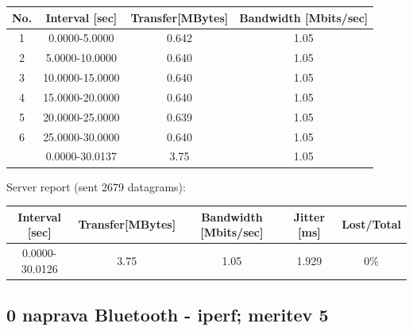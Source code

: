 \documentclass[11pt,a4paper,slovene]{article}
\begin{document}
\begin{table}[H]
	\begin{adjustwidth}{-3cm}{-3cm}
	\centering
		\begin{tabular}{c|c|c|c}
		\hline
		\textbf{No.} & \textbf{Interval [sec]} & \textbf{Transfer[MBytes]} & \textbf{Bandwidth [Mbits/sec]}\\
     		\hline
     		1 & 0.0000-5.0000 & 0.642 & 1.05\\
  		2 & 5.0000-10.0000 & 0.640 & 1.05\\
  		3 & 10.0000-15.0000 & 0.640 & 1.05\\
  		4 & 15.0000-20.0000 & 0.640 & 1.05\\
  		5 & 20.0000-25.0000 & 0.639 & 1.05\\
  		6 & 25.0000-30.0000 & 0.640 & 1.05\\
  		\hline
  		& 0.0000-30.0137 & 3.75 & 1.05\\
  		\hline
    		\end{tabular}
    	\end{adjustwidth}
\end{table}

Server report (sent 2679 datagrams):\\

\begin{table}[H]
	\begin{adjustwidth}{-3cm}{-3cm}
	\centering
		\begin{tabular}{c|c|c|c|c}
		\hline
		\textbf{Interval [sec]} & \textbf{Transfer[MBytes]} & \textbf{Bandwidth [Mbits/sec]} & \textbf{Jitter [ms]} & \textbf{Lost/Total}\\
     		\hline
     		0.0000-30.0126 & 3.75 & 1.05 & 1.929 & 0\%\\
  		\hline
    		\end{tabular}
    	\end{adjustwidth}
\end{table}

\subsection{0 naprava Bluetooth - iperf; meritev 5}
\end{document}
